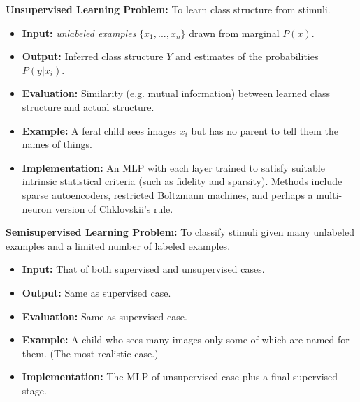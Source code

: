 \documentclass[12pt]{article}
\begin{document}
\textbf{Unsupervised Learning Problem:} To learn class structure from stimuli.
\begin{itemize}
\item \textbf{Input:} \textit{unlabeled examples} $\{x_1,...,x_n\}$ drawn from marginal $P(x)$.
\item \textbf{Output:} Inferred class structure $Y$ 
  and estimates of the probabilities $P(y|x_{i})$.
\item \textbf{Evaluation:} Similarity (e.g. mutual information) between learned class structure and actual structure.
\item \textbf{Example:} A feral child sees images $x_i$ but has no parent to tell them the names of things.
\item \textbf{Implementation:} An MLP with each layer trained to satisfy suitable intrinsic statistical criteria (such as fidelity and sparsity). Methods include sparse autoencoders, restricted Boltzmann machines, and perhaps a multi-neuron version of Chklovskii's rule.
\end{itemize}


\textbf{Semisupervised Learning Problem:} To classify stimuli given many unlabeled examples and a limited number of labeled examples.
\begin{itemize}
\item \textbf{Input:} That of both supervised and unsupervised cases.
\item \textbf{Output:} Same as supervised case.
\item \textbf{Evaluation:} Same as supervised case.
\item \textbf{Example:} A child who sees many images only some of which are named for them. (The most realistic case.)
\item \textbf{Implementation:} The MLP of unsupervised case plus a final supervised stage.
\end{itemize}










\end{document}
